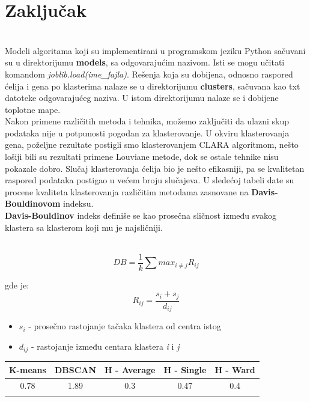 \documentclass[a4paper]{article}
\begin{document}
\section{Zaključak}
\\ Modeli algoritama koji su implementirani u programskom jeziku Python sačuvani su u direktorijumu \textbf{models}, sa odgovarajućim nazivom. Isti se mogu učitati komandom \textit{joblib.load(ime\_fajla)}.
Rešenja koja su dobijena, odnosno raspored ćelija i gena po klasterima nalaze se u direktorijumu \textbf{clusters}, sačuvana kao txt datoteke odgovarajućeg naziva.
U istom direktorijumu nalaze se i dobijene toplotne mape.
\\

Nakon primene različitih metoda i tehnika, možemo zaključiti da ulazni skup podataka nije u potpunosti pogodan za klasterovanje. U okviru klasterovanja gena, poželjne rezultate postigli smo klasterovanjem CLARA algoritmom, nešto lošiji bili su rezultati primene Louviane metode, dok se ostale tehnike nisu pokazale dobro. Slučaj klasterovanja ćelija bio je nešto efikasniji, pa se kvalitetan raspored podataka postigao u većem broju slučajeva.
U sledećoj tabeli date su procene kvaliteta klasterovanja različitim metodama zasnovane na \textbf{Davis-Bouldinovom} indeksu.
\\
\textbf{Davis-Bouldinov} indeks definiše se kao prosečna sličnost između svakog klastera sa klasterom koji mu je najsličniji.

\\

$$ DB = \frac{1}{k}\sum max_{i\neq j}R_{ij} $$

gde je:
    $$ R_{ij} = \frac{s_{i}+s_{j}}{d_{ij}} $$

\begin{itemize}
    \item $s_{i}$ - prosečno rastojanje tačaka klastera od centra istog
    \item $d_{ij}$ - rastojanje između centara klastera \textit{i} i \textit{j}
\end{itemize}


\begin{center}
 \begin{tabular}{||c c c c c||} 
 \hline
 K-means & DBSCAN & H - Average & H - Single & H - Ward \\ [0.5ex] 
 \hline\hline
 0.78 & 1.89 & 0.3 & 0.47 & 0.4 \\ 
 \hline
\caption{\label{tab:table-name}KLASTEROVANJE GENA}
\end{tabular}
\end{center}
\end{document}
